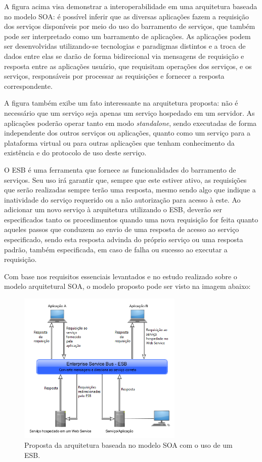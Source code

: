 A figura acima visa demonstrar a interoperabilidade em uma arquitetura baseada no modelo SOA: é possível inferir que as diversas aplicações fazem a requisição dos serviços disponíveis por meio do uso do barramento de serviços, que também pode ser interpretado como um barramento de aplicações. As aplicações podem ser desenvolvidas utilizando-se tecnologias e paradigmas distintos e a troca de dados entre elas se darão de forma bidirecional via mensagens de requisição e resposta entre as aplicações usuário, que requisitam operações dos serviços, e os serviços, responsáveis por processar as requisições e fornecer a resposta correspondente.

A figura também exibe um fato interessante na arquitetura proposta: não é necessário que um serviço seja apenas um serviço hospedado em um servidor. As aplicações poderão operar tanto em modo \textit{standalone}, sendo executadas de forma independente dos outros serviços ou aplicações, quanto como um serviço para a plataforma virtual ou para outras aplicações que tenham conhecimento da existência e do protocolo de uso deste serviço.

O ESB é uma ferramenta que fornece as funcionalidades do barramento de serviços. Seu uso irá garantir que, sempre que este estiver ativo, as requisições que serão realizadas sempre terão uma resposta, mesmo sendo algo que indique a inatividade do serviço requerido ou a não autorização para acesso à este. Ao adicionar um novo serviço à arquitetura utilizando o ESB, deverão ser especificados tanto os procedimentos quando uma nova requisição for feita quanto aqueles passos que conduzem ao envio de uma resposta de acesso ao serviço especificado, sendo esta resposta advinda do próprio serviço ou uma resposta padrão, também especificada, em caso de falha ou sucesso ao executar a requisição.

Com base nos requisitos essenciais levantados e no estudo realizado sobre o modelo arquitetural SOA, o modelo proposto pode ser visto na imagem abaixo:

\begin{figure}[htb]
\centering
\includegraphics[width=0.7\textwidth]{figuras/uso_esb.PNG}
\caption{Proposta da arquitetura baseada no modelo SOA com o uso de um ESB.}
\label{uso_esb}
\end{figure}

